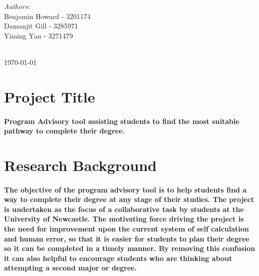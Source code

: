 \documentclass[12pt]{article}
\begin{document}
\begin{titlepage}
\begin{minipage}{1.0\textwidth}
\begin{flushleft} \large
\emph{Authors:}\\
Benjamin \textsc Howard - 3201174\\ %
Damanjit \textsc Gill - 3285971 \\ %
Yiming \textsc Yan - 3271479 \\%
\end{flushleft}
\end{minipage}\\[2cm]



{\large \today}\\[2cm] %

\vfill %

\end{titlepage}

\section{Project Title} %
 \paragraph{Program Advisory tool assisting students to find the most suitable pathway to complete their degree.}


\section{Research Background}%
 \paragraph{The objective of the program advisory tool is to help students find a way to complete their degree at any stage of their studies. The project is undertaken as the focus of a collaborative task by students at the University of Newcastle. The motivating force driving the project is the need for improvement upon the current system of self calculation and human error, so that it is easier for students to plan their degree so it can be completed in a timely manner. By removing this confusion it can also helpful to encourage students who are thinking about attempting a second major or degree.}
  
\end{document}

